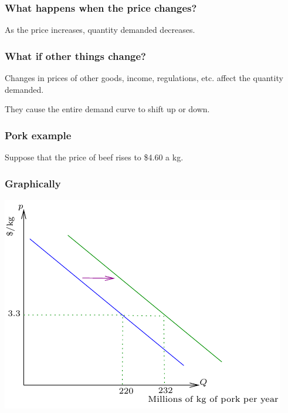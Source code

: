 \documentclass[xcolor=pdftex,dvipsnames]{beamer}
\begin{document}
\begin{frame}
\frametitle{What happens when the price changes?}
As the price increases, quantity demanded decreases.

\bigskip
{}




\end{frame}






\begin{frame}
\frametitle{What if other things change?}
Changes in prices of other goods, income, regulations, etc. affect the quantity demanded.
\bigskip

They cause the entire demand curve to shift up or down.
\end{frame}





\begin{frame}
\frametitle{Pork example}
Suppose that the price of beef rises to \$4.60 a kg.



\bigskip
{}


\end{frame}



\begin{frame}
\frametitle{Graphically}
\begin{center}\includegraphics{pics/DemandShift}\end{center}
\end{frame}
\end{document}
